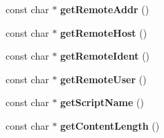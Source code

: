 \begin{CompactItemize}
\item 
const char $\ast$ \textbf{getRemoteAddr} ()\label{classRawRequest_bd82dafc5a3efe788e268f54a379b6e5}

\item 
const char $\ast$ \textbf{getRemoteHost} ()\label{classRawRequest_fc6f560a044e651a4b3518173a395c06}

\item 
const char $\ast$ \textbf{getRemoteIdent} ()\label{classRawRequest_2d50d93b2537dd3997f51406eb95c630}

\item 
const char $\ast$ \textbf{getRemoteUser} ()\label{classRawRequest_f40681cfa92a731ed3d4e99cf898484c}

\item 
const char $\ast$ \textbf{getScriptName} ()\label{classRawRequest_1063865b22136eb84b9f50b49d6b58f0}

\item 
const char $\ast$ \textbf{getContentLength} ()\label{classRawRequest_1e4033850288b7aae27da893e98c35ff}

\end{CompactItemize}
